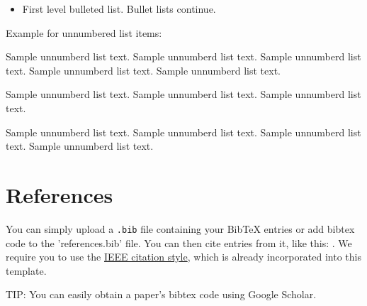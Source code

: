 \documentclass[10pt,a4paper]{article}
\newenvironment{unlist}{%
  \begin{list}{}{%
    \setlength{\labelwidth}{0pt}%
    \setlength{\labelsep}{0pt}%
    \setlength{\leftmargin}{2em}%
    \setlength{\itemindent}{-2em}%
    \setlength{\topsep}{\medskipamount}%
    \setlength{\itemsep}{3pt}%
  }%
}{%
  \end{list}%
}
\begin{document}
\begin{appendices}
\begin{itemize}
\item First level bulleted list. Bullet lists continue.
\end{itemize}

\noindent
Example for unnumbered list items:

\begin{unlist}
\item Sample unnumberd list text. Sample unnumberd list text. Sample unnumberd list text. Sample unnumberd list text. Sample unnumberd list text.

\item Sample unnumberd list text. Sample unnumberd list text. Sample unnumberd list text.

\item Sample unnumberd list text. Sample unnumberd list text. Sample unnumberd list text. Sample unnumberd list text. 
\end{unlist}


\section{References}

You can simply upload a \verb|.bib| file containing your BibTeX entries or add bibtex code to the 'references.bib' file. You can then cite entries from it, like this: \cite{navarro2013learning}. We require you to use the \href{https://www.bath.ac.uk/publications/library-guides-to-citing-referencing/attachments/ieee-style-guide.pdf}{IEEE citation style}, which is already incorporated into this template. 

TIP: You can easily obtain a paper's bibtex code using Google Scholar.


\end{appendices}
\end{document}
